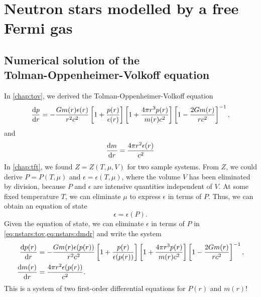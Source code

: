 \chapter{Neutron stars modelled by a free Fermi gas}


\section{Numerical solution of the \texorpdfstring{\\}{}Tolman-Oppenheimer-Volkoff equation}
\label{sec:nstars:numtov}

In \cref{chap:tov}, we derived the Tolman-Oppenheimer-Volkoff equation
\begin{equation}
	\odv{p}{r} = -\frac{G m(r) \epsilon(r)}{r^2 c^2} \left[ 1 + \frac{p(r)}{\epsilon(r)} \right] \left[ 1 + \frac{4 \pi r^3 p(r)}{m(r) c^2} \right] \left[ 1 - \frac{2 G m(r)}{r c^2} \right]^{-1} ,
\label{eq:nstars:tov}
\end{equation}
and
\begin{equation}
	\odv{m}{r} = \frac{4 \pi r^2 \epsilon(r)}{c^2}
\label{eq:nstars:dmdr}
\end{equation}
In \cref{chap:tft}, we found $Z = Z(T, \mu, V)$ for two sample systems.
From $Z$, we could derive $P = P(T, \mu)$ and $\epsilon = \epsilon(T, \mu)$, where the volume $V$ has been eliminated by division, because $P$ and $\epsilon$ are intensive quantities independent of $V$.
At some fixed temperature $T$, we can eliminate $\mu$ to express $\epsilon$ in terms of $P$.
Thus, we can obtain an equation of state
\begin{equation}
	\epsilon = \epsilon(P).
\label{eq:nstars:eos}
\end{equation}
Given the equation of state, we can eliminate $\epsilon$ in terms of $P$ in \cref{eq:nstars:tov,eq:nstars:dmdr} and write the system
\begin{equation}
\begin{split}
	\odv{p(r)}{r} &= -\frac{G m(r) \epsilon(p(r))}{r^2 c^2} \left[ 1 + \frac{p(r)}{\epsilon(p(r))} \right] \left[ 1 + \frac{4 \pi r^3 p(r)}{m(r) c^2} \right] \left[ 1 - \frac{2 G m(r)}{r c^2} \right]^{-1}, \\
	\odv{m(r)}{r} &= \frac{4 \pi r^2 \epsilon(p(r))}{c^2}. \\
\end{split}
\end{equation}
This is a system of two first-order differential equations for $P(r)$ and $m(r)$!
